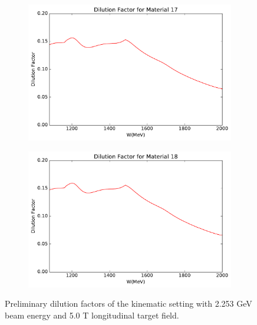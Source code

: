 \begin{figure}[p!]
  \centering
  \begin{subfigure}[t]{0.49\textwidth}
    \includegraphics[width=\textwidth]{figs/dilution-22535000-17.pdf}
  \end{subfigure}
  \begin{subfigure}[t]{0.49\textwidth}
    \includegraphics[width=\textwidth]{figs/dilution-22535000-18.pdf}
  \end{subfigure}
  \caption[Dilution factors with $E=2.253$ GeV and $B=5.0$ T (longitudinal).]{Preliminary dilution factors of the kinematic setting with 2.253 GeV beam energy and 5.0 T longitudinal target field. \label{C7S4F4}}
\end{figure}

